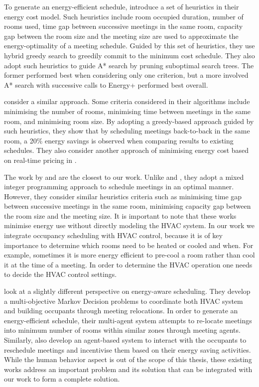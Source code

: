 To generate an energy-efficient schedule, \cite{majumdar2012energy} introduce a set of heuristics in their energy cost model. 
Such heuristics include room occupied duration, number of rooms used, time gap between successive meetings in the same room, capacity gap between the room size and the meeting size are used to approximate the energy-optimality of a meeting schedule. 
Guided by this set of heuristics, they use hybrid greedy search to greedily commit to the minimum cost schedule. They also adopt such heuristics to guide A* search by pruning suboptimal search trees. The former performed best when considering only one criterion, but a more involved A* search with successive calls to Energy+ performed best overall.

\cite{pan2012thermal} consider a similar approach. Some criteria considered in their algorithms include minimising the number of rooms, minimising time between meetings in the same room, and minimising room size. By adopting a greedy-based approach guided by such heuristics, they show that by scheduling meetings back-to-back in the same room, a 20\% energy savings is observed when comparing results to existing schedules. They also consider another approach of minimising energy cost based on real-time pricing in \cite{pan2013minimizing}.

The work by \cite{kwak2014building} and \cite{chai2014minimizing} are the closest to our work. Unlike \cite{majumdar2012energy} and \cite{pan2012thermal}, they adopt a mixed integer programming approach to schedule meetings in an optimal manner. However, they consider similar heuristics criteria such as minimising time gap between successive meetings in the same room, minimising capacity gap between the room size and the meeting size. It is important to note that these works minimise energy use without directly modeling the HVAC system. In our work we integrate occupancy scheduling with HVAC control, because it is of key importance to determine which rooms need to be heated or cooled and when. For example, sometimes it is more energy efficient to pre-cool a room rather than cool it at the time of a meeting. In order to determine the HVAC operation one needs to decide the HVAC control settings.

\cite{klein2012coordinating} look at a slightly different perspective on energy-aware scheduling. They develop a multi-objective Markov Decision problems to coordinate both HVAC system and building occupants through meeting relocations. In order to generate an energy-efficient schedule, their multi-agent system attempts to re-locate meetings into minimum number of rooms within similar zones through meeting agents. Similarly, \cite{kwak2014building} also develop an agent-based system to interact with the occupants to reschedule meetings and incentivise them based on their energy saving activities. While the human behavior aspect is out of the scope of this thesis, these existing works address an important problem and its solution that can be integrated with our work to form a complete solution.

